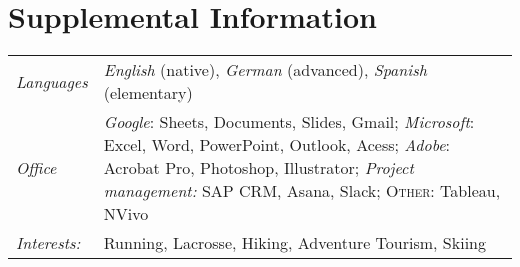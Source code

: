 \documentclass[a4paper,10pt]{article}
\begin{document}
\section{Supplemental Information}
\begin{supertabular}{p{3.4cm} p{13.9cm}}
	\emph{Languages}			& \small\emph{English} (native), \emph{German} (advanced), \emph{Spanish} (elementary) \vspace{1mm} \\

	\emph{Office}					& \small\emph{Google}: \footnotesize Sheets, Documents, Slides, Gmail; \small\emph{Microsoft}: \footnotesize Excel, Word, PowerPoint, Outlook, Acess;	\small\emph{Adobe}: \footnotesize Acrobat Pro, Photoshop, Illustrator; \small\emph{Project management:} \footnotesize SAP CRM, Asana, Slack; \small\textsc{Other:} \footnotesize Tableau, NVivo \vspace{1mm} \\
	\emph{Interests:} 		& \small Running, Lacrosse, Hiking, Adventure Tourism, Skiing \\

\end{supertabular}
\end{document}
